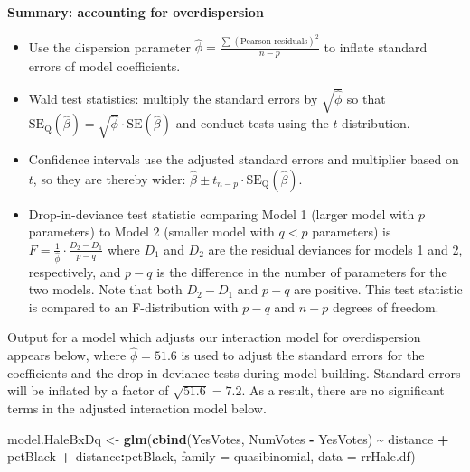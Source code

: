 \documentclass[
]{krantz}
\newenvironment{Shaded}{\begin{snugshade}}{\end{snugshade}}
\newcommand{\AttributeTok}[1]{\textcolor[rgb]{0.27,0.27,0.27}{#1}}
\newcommand{\FunctionTok}[1]{\textcolor[rgb]{0.27,0.27,0.27}{\textbf{#1}}}
\newcommand{\NormalTok}[1]{#1}
\newcommand{\OtherTok}[1]{\textcolor[rgb]{0.37,0.37,0.37}{#1}}
\newcommand{\SpecialCharTok}[1]{\textcolor[rgb]{0.43,0.43,0.43}{\textbf{#1}}}
\providecommand{\tightlist}{%
  \setlength{\itemsep}{0pt}\setlength{\parskip}{0pt}}
\begin{document}
\textbf{Summary: accounting for overdispersion}

\begin{itemize}
\tightlist
\item
  Use the dispersion parameter \(\hat\phi=\frac{\sum(\textrm{Pearson residuals})^2}{n-p}\) to inflate standard errors of model coefficients.
\item
  Wald test statistics: multiply the standard errors by \(\sqrt{\hat{\phi}}\) so that \(\textrm{SE}_\textrm{Q}(\hat\beta)=\sqrt{\hat\phi}\cdot\textrm{SE}(\hat\beta)\) and conduct tests using the \(t\)-distribution.
\item
  Confidence intervals use the adjusted standard errors and multiplier based on \(t\), so they are thereby wider: \(\hat\beta \pm t_{n-p} \cdot \textrm{SE}_\textrm{Q}(\hat\beta)\).
\item
  Drop-in-deviance test statistic comparing Model 1 (larger model with \(p\) parameters) to Model 2 (smaller model with \(q<p\) parameters) is \(F = \frac{1}{\hat\phi} \cdot \frac{D_2 - D_1}{p-q}\) where \(D_1\) and \(D_2\) are the residual deviances for models 1 and 2, respectively, and \(p-q\) is the difference in the number of parameters for the two models. Note that both \(D_2-D_1\) and \(p-q\) are positive. This test statistic is compared to an F-distribution with \(p-q\) and \(n-p\) degrees of freedom.
\end{itemize}

Output for a model which adjusts our interaction model for overdispersion appears below, where \(\hat{\phi}=51.6\) is used to adjust the standard errors for the coefficients and the drop-in-deviance tests during model building. Standard errors will be inflated by a factor of \(\sqrt{51.6}=7.2\). As a result, there are no significant terms in the adjusted interaction model below.

\begin{Shaded}
\begin{Highlighting}[]
\NormalTok{model.HaleBxDq }\OtherTok{\textless{}{-}} \FunctionTok{glm}\NormalTok{(}\FunctionTok{cbind}\NormalTok{(YesVotes, NumVotes }\SpecialCharTok{{-}}\NormalTok{ YesVotes) }\SpecialCharTok{\textasciitilde{}}
\NormalTok{  distance }\SpecialCharTok{+}\NormalTok{ pctBlack }\SpecialCharTok{+}\NormalTok{ distance}\SpecialCharTok{:}\NormalTok{pctBlack, }
  \AttributeTok{family =}\NormalTok{ quasibinomial, }\AttributeTok{data =}\NormalTok{ rrHale.df)}
\end{Highlighting}
\end{Shaded}
\end{document}
